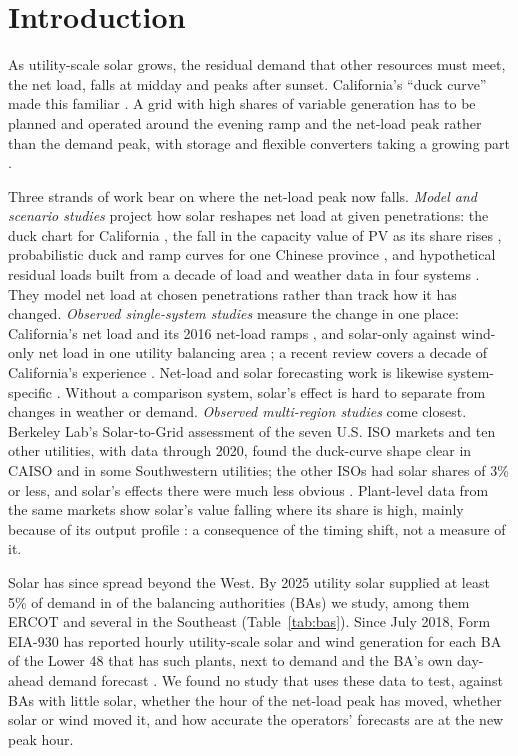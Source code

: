 \documentclass[conference,a4paper]{IEEEtran}
\begin{document}
\section{Introduction}

As utility-scale solar grows, the residual demand that other resources must meet, the net load, falls at midday and peaks after sunset. California's ``duck curve'' made this familiar \cite{denholm2015duck}. A grid with high shares of variable generation has to be planned and operated around the evening ramp and the net-load peak rather than the demand peak, with storage and flexible converters taking a growing part \cite{kroposki2017renewable}.

Three strands of work bear on where the net-load peak now falls. \emph{Model and scenario studies} project how solar reshapes net load at given penetrations: the duck chart for California \cite{denholm2015duck}, the fall in the capacity value of PV as its share rises \cite{mills2013value}, probabilistic duck and ramp curves for one Chinese province \cite{hou2019probabilistic}, and hypothetical residual loads built from a decade of load and weather data in four systems \cite{ruggles2022peak}. They model net load at chosen penetrations rather than track how it has changed. \emph{Observed single-system studies} measure the change in one place: California's net load and its 2016 net-load ramps \cite{shaker2016impacts,huang2018ramp}, and solar-only against wind-only net load in one utility balancing area \cite{lave2016comparison}; a recent review covers a decade of California's experience \cite{qiu2025duck}. Net-load and solar forecasting work is likewise system-specific \cite{wang2018netload,kaur2016benefits}. Without a comparison system, solar's effect is hard to separate from changes in weather or demand. \emph{Observed multi-region studies} come closest. Berkeley Lab's Solar-to-Grid assessment of the seven U.S. ISO markets and ten other utilities, with data through 2020, found the duck-curve shape clear in CAISO and in some Southwestern utilities; the other ISOs had solar shares of 3\% or less, and solar's effects there were much less obvious \cite{mills2021solar2grid}. Plant-level data from the same markets show solar's value falling where its share is high, mainly because of its output profile \cite{millstein2021value}: a consequence of the timing shift, not a measure of it.

Solar has since spread beyond the West. By 2025 utility solar supplied at least 5\% of demand in  of the balancing authorities (BAs) we study, among them ERCOT and several in the Southeast (Table~\ref{tab:bas}). Since July 2018, Form EIA-930 has reported hourly utility-scale solar and wind generation for each BA of the Lower 48 that has such plants, next to demand and the BA's own day-ahead demand forecast \cite{eia930}. We found no study that uses these data to test, against BAs with little solar, whether the hour of the net-load peak has moved, whether solar or wind moved it, and how accurate the operators' forecasts are at the new peak hour.
\end{document}
